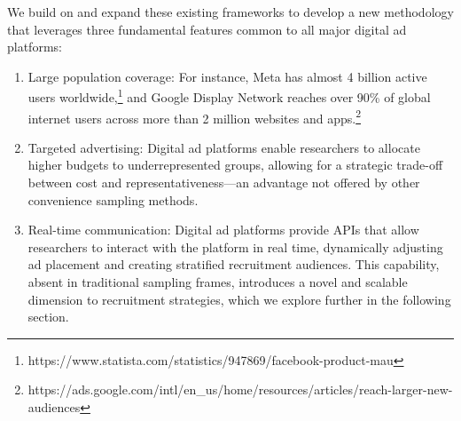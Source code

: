 We build on and expand these existing frameworks to develop a new methodology that leverages three fundamental features common to all major digital ad platforms:


\begin{enumerate}
\item Large population coverage: For instance, Meta has almost 4 billion active users worldwide,\footnote{https://www.statista.com/statistics/947869/facebook-product-mau} and Google Display Network reaches over 90\% of global internet users across more than 2 million websites and apps.\footnote{https://ads.google.com/intl/en\_us/home/resources/articles/reach-larger-new-audiences}

\item Targeted advertising: Digital ad platforms enable researchers to allocate higher budgets to underrepresented groups, allowing for a strategic trade-off between cost and representativeness---an advantage not offered by other convenience sampling methods.

\item Real-time communication: Digital ad platforms provide APIs that allow researchers to interact with the platform in real time, dynamically adjusting ad placement and creating stratified recruitment audiences. This capability, absent in traditional sampling frames, introduces a novel and scalable dimension to recruitment strategies, which we explore further in the following section.
\end{enumerate}







